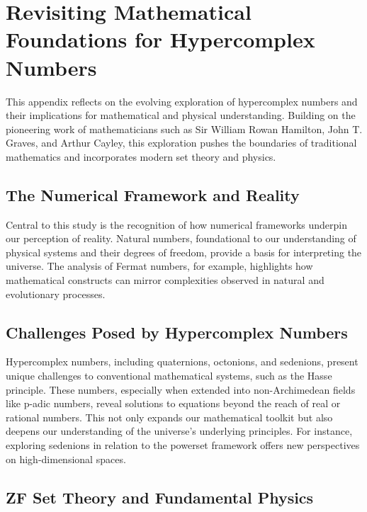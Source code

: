 \documentclass[12pt]{article}
\begin{document}
\appendix



\section{Revisiting Mathematical Foundations for Hypercomplex Numbers}

This appendix reflects on the evolving exploration of hypercomplex numbers and their implications for mathematical and physical understanding. Building on the pioneering work of mathematicians such as Sir William Rowan Hamilton, John T. Graves, and Arthur Cayley, this exploration pushes the boundaries of traditional mathematics and incorporates modern set theory and physics.

\subsection{The Numerical Framework and Reality}

Central to this study is the recognition of how numerical frameworks underpin our perception of reality. Natural numbers, foundational to our understanding of physical systems and their degrees of freedom, provide a basis for interpreting the universe. The analysis of Fermat numbers, for example, highlights how mathematical constructs can mirror complexities observed in natural and evolutionary processes.

\subsection{Challenges Posed by Hypercomplex Numbers}

Hypercomplex numbers, including quaternions, octonions, and sedenions, present unique challenges to conventional mathematical systems, such as the Hasse principle. These numbers, especially when extended into non-Archimedean fields like p-adic numbers, reveal solutions to equations beyond the reach of real or rational numbers. This not only expands our mathematical toolkit but also deepens our understanding of the universe’s underlying principles. For instance, exploring sedenions in relation to the powerset framework offers new perspectives on high-dimensional spaces.

\subsection{ZF Set Theory and Fundamental Physics}
\end{document}
